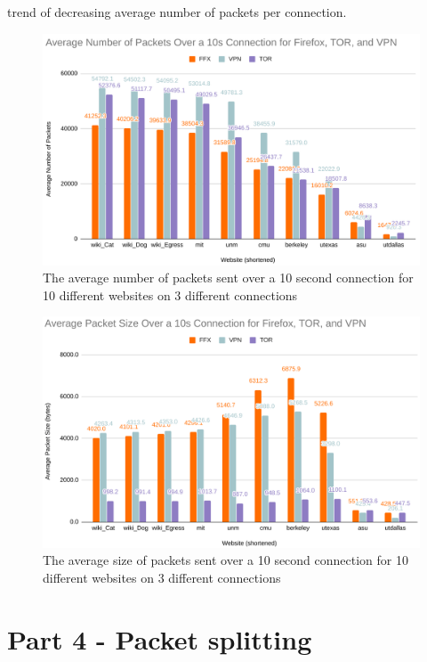 \documentclass[11pt]{article}
\begin{document}
trend of decreasing average number of packets per connection. 
\begin{figure}[p]
  \centering
  \includegraphics[width=1\linewidth]{./average_packets.png}
  \caption{\label{fig:avg_packets}
  The average number of packets sent over a 10 second connection for 10 different websites on 3 different connections}
\end{figure}
\begin{figure}[p]
  \centering
  \includegraphics[width=1\linewidth]{./average_size.png}
  \caption{\label{fig:avg_size}
  The average size of packets sent over a 10 second connection for 10 different websites on 3 different connections}
\end{figure}
\section*{Part 4 - Packet splitting}

\end{document}
